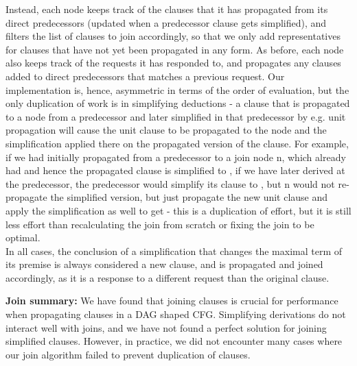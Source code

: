 Instead, each node keeps track of the clauses that it has propagated from its direct predecessors (updated when a predecessor clause gets simplified), and filters the list of clauses to join accordingly, so that we only add representatives for clauses that have not yet been propagated in any form. 
As before, each node also keeps track of the requests it has responded to, and propagates any clauses added to direct predecessors that matches a previous request.
Our implementation is, hence, asymmetric in terms of the order of evaluation, but the only duplication of work is in simplifying deductions - a clause that is propagated to a node from a predecessor and later simplified in that predecessor by e.g. unit propagation will cause the unit clause to be propagated to the node and the simplification applied there on the propagated version of the clause.
For example, if we had initially propagated  from a predecessor to a join node n, which already had  and hence the propagated clause is simplified to , if we have later derived  at the predecessor, the predecessor would simplify its clause to , but n would not re-propagate the simplified version, but just propagate the new unit clause  and apply the simplification as well to get  - this is a duplication of effort, but it is still less effort than recalculating the join from scratch or fixing the join to be optimal.\\
In all cases, the conclusion of a simplification that changes the maximal term of its premise is always considered a new clause, 
and is propagated and joined accordingly, as it is a response to a different request than the original clause.

\textbf{Join summary:} We have found that joining clauses is crucial for performance when propagating clauses in a DAG shaped CFG.
Simplifying derivations do not interact well with joins, and we have not found a perfect solution for joining simplified clauses.
However, in practice, we did not encounter many cases where our join algorithm failed to prevent duplication of clauses.



